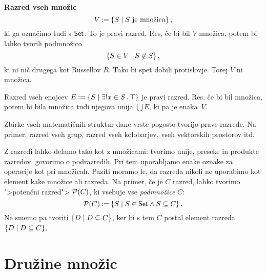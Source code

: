 \begin{primer}
  \textbf{Razred vseh množic}
  \begin{equation*}
    V \mathbin{{:}{=}} \left\{ S \; \middle| \; \text{$S$ je množica} \right\},
  \end{equation*}
% 
  ki ga označimo tudi s $\mathsf{Set}$. To je pravi razred. Res, če bi bil $V$ množica,
  potem bi lahko tvorili podmnožico
  \begin{equation*}
    \left\{ S \in V \; \middle| \; S \not\in S\right\},
  \end{equation*}
  ki ni nič drugega kot Russellov $R$. Tako bi spet dobili protislovje. Torej $V$
  ni množica.
\end{primer}

\begin{primer}
  Razred vseh enojcev $E \mathbin{{:}{=}} \left\{ S \; \middle| \; \exists! x \in S \,.\, \top \right\}$ je pravi razred. Res, če bi bil množica, potem bi bila množica tudi njegova unija $\bigcup E$, ki pa je enaka~$V$.
\end{primer}

\begin{primer}
  Zbirke vseh matematičnih struktur dane vrste pogosto tvorijo prave razrede. Na primer, razred vseh grup, razred vseh kolobarjev, vseh vektorskih prostorov itd.
\end{primer}

Z razredi lahko delamo tako kot z množicami: tvorimo unije, preseke in produkte
razredov, govorimo o podrazredih. Pri tem uporabljamo enake oznake za
operacije kot pri množicah. Paziti moramo le, da razreda nikoli ne uporabimo kot
element kake množice ali razreda. Na primer, če je $C$ razred, lahko tvorimo
">potenčni razred"> $\mathcal{P}(C)$, ki vsebuje vse \emph{podmnožice} $C$:
\begin{equation*}
    \mathcal{P}(C) \mathbin{{:}{=}} \left\{ S \; \middle| \; S \in \mathsf{Set} \land S \subseteq C \right\}.
\end{equation*}
%
Ne smemo pa tvoriti $\left\{ D \; \middle| \; D \subseteq C \right\}$, ker bi s tem $C$ postal element razreda $\left\{D \; \middle| \; D \subseteq C\right\}$.

\section{Družine množic}


